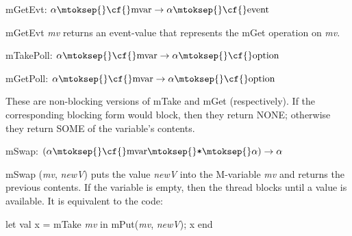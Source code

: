 \begin{descr}
\begin{speccomment}
\begin{code}
\end{code}
     \end{speccomment}
\item {}{} {\cf mGetEvt: \(\alpha\mtoksep{}\mbox{\cf{}mvar}\rightarrow \alpha\mtoksep{}\mbox{\cf{}event}\)}\label{val-SYNC_VAR.mGetEvt}


\begin{speccomment}
\item {\cf \small m\-Get\-Evt \mbox{\cf \small \textit{mv}}           } 
returns an event-value that represents the {\cf \small m\-Get} 	  operation on \mbox{\cf \small \textit{mv}}.     \end{speccomment}
\item {}{} {\cf mTakePoll: \(\alpha\mtoksep{}\mbox{\cf{}mvar}\rightarrow \alpha\mtoksep{}\mbox{\cf{}option}\)}\label{val-SYNC_VAR.mTakePoll}

\item {}{} {\cf mGetPoll: \(\alpha\mtoksep{}\mbox{\cf{}mvar}\rightarrow \alpha\mtoksep{}\mbox{\cf{}option}\)}\label{val-SYNC_VAR.mGetPoll}


\begin{speccomment}
\item 

	  These are non-blocking versions of {\cf \small m\-Take} and 	  {\cf \small m\-Get} (respectively). 	  If the corresponding blocking form would block, then they return 	  {\cf \small NONE}; otherwise 	  they return {\cf \small SOME} 	  of the variable's contents.     \end{speccomment}
\item {}{} {\cf mSwap: \((\alpha\mtoksep{}\mbox{\cf{}mvar}\mtoksep{}\verb,*,\mtoksep{}\alpha)\rightarrow \alpha\)}\label{val-SYNC_VAR.mSwap}


\begin{speccomment}
\item {\cf \small m\-Swap (\mbox{\cf \small \textit{mv}}, \mbox{\cf \small \textit{new\-V}})           } 
puts the value \mbox{\cf \small \textit{new\-V}} into the M-variable \mbox{\cf \small \textit{mv}} and returns 	  the previous contents. 	  If the variable is empty, then the thread blocks until 	  a value is available. 	  It is equivalent to the code: 	  
\begin{code}
let val x = mTake \mbox{\cf \small \textit{mv}} in mPut(\mbox{\cf \small \textit{mv}}, \mbox{\cf \small \textit{new\-V}}); x end
	  

\end{code}
\end{speccomment}
\end{descr}
